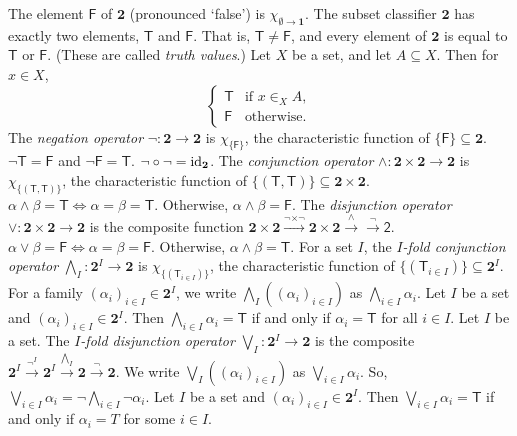  The element $\mathsf{F}$ of $\mathbf{2}$ (pronounced `false') is $\chi_{\emptyset \to \mathbf{1}}$.
 The subset classifier $\mathbf{2}$ has exactly two elements, $\mathsf{T}$ and $\mathsf{F}$. That is, $\mathsf{T} \neq \mathsf{F}$, and every element of $\mathbf{2}$ is equal to $\mathsf{T}$ or $\mathsf{F}$. (These are called \textit{truth values}.)
 Let $X$ be a set, and let $A \subseteq X$. Then for $x \in X$,
\begin{equation*}
	\begin{cases}
		\mathsf{T} & \text{if } x \in_X A,\\
		\mathsf{F} & \text{otherwise.}
	\end{cases}
\end{equation*}
 The \textit{negation operator} $\neg \colon \mathbf{2} \to \mathbf{2}$ is $\chi_{\{\mathsf{F}\}}$, the characteristic function of $\{\mathsf{F}\} \subseteq \mathbf{2}$.
 $\neg \mathsf{T} = \mathsf{F}$ and $\neg \mathsf{F} = \mathsf{T}$.
 $\neg \circ \neg = \operatorname{id}_{\mathbf{2}}$.
 The \textit{conjunction operator} $\wedge \colon \mathbf{2} \times \mathbf{2} \to \mathbf{2}$ is $\chi_{\{(\mathsf{T}, \mathsf{T})\}}$, the characteristic function of $\{(\mathsf{T}, \mathsf{T})\} \subseteq \mathbf{2} \times \mathbf{2}$.
 $\alpha \wedge \beta = \mathsf{T} \iff \alpha = \beta = \mathsf{T}$. Otherwise, $\alpha \wedge \beta = \mathsf{F}$.
 The \textit{disjunction operator} $\vee \colon \mathbf{2} \times \mathbf{2} \to \mathbf{2}$ is the composite function $\mathbf{2} \times \mathbf{2} \xrightarrow{\neg \times \neg} \mathbf{2} \times \mathbf{2} \xrightarrow{\wedge} \xrightarrow{\neg} \mathsf{2}$.
 $\alpha \vee \beta = \mathsf{F} \iff \alpha = \beta = \mathsf{F}$. Otherwise, $\alpha \wedge \beta = \mathsf{T}$.
 For a set $I$, the \textit{$I$-fold conjunction operator} $\bigwedge_I \colon \mathbf{2}^I \to \mathbf{2}$ is $\chi_{\{(\mathsf{T}_{i \in I})\}}$, the characteristic function of $\{(\mathsf{T}_{i \in I})\} \subseteq \mathbf{2}^I$. For a family $(\alpha_i)_{i \in I} \in \mathbf{2}^I$, we write $\bigwedge_I((\alpha_i)_{i \in I})$ as $\bigwedge_{i \in I} \alpha_i$.
 Let $I$ be a set and $(\alpha_i)_{i \in I} \in \mathbf{2}^I$. Then $\bigwedge_{i \in I} \alpha_i = \mathsf{T}$ if and only if $\alpha_i = \mathsf{T}$ for all $i \in I$.
 Let $I$ be a set. The \textit{$I$-fold disjunction operator} $\bigvee_I \colon \mathbf{2}^I \to \mathbf{2}$ is the composite $\mathbf{2}^I \xrightarrow{\neg^I} \mathbf{2}^I \xrightarrow{\bigwedge_I} \mathbf{2} \xrightarrow{\neg} \mathbf{2}$. We write $\bigvee_I((\alpha_i)_{i \in I})$ as $\bigvee_{i \in I} \alpha_i$. So, $\bigvee_{i \in I} \alpha_i = \neg \bigwedge_{i \in I} \neg \alpha_i$.
 Let $I$ be a set and $(\alpha_i)_{i \in I} \in \mathbf{2}^I$. Then $\bigvee_{i \in I} \alpha_i = \mathsf{T}$ if and only if $\alpha_i = T$ for some $i \in I$.